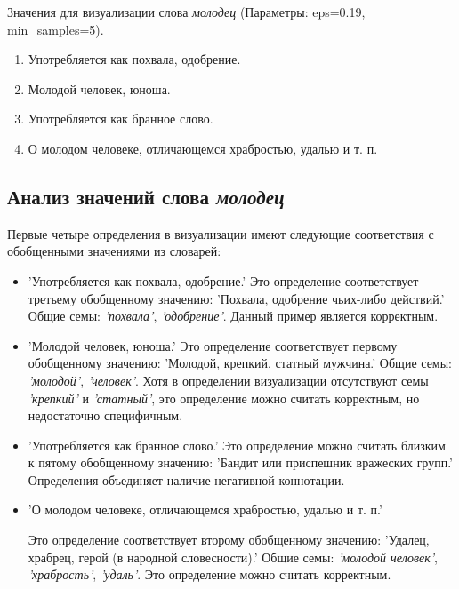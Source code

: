 Значения для визуализации слова \textit{молодец} (Параметры: eps=0.19, min\_samples=5).

\begin{enumerate}
    \item Употребляется как похвала, одобрение.
    \item Молодой человек, юноша.
    \item Употребляется как бранное слово.
    \item О молодом человеке, отличающемся храбростью, удалью и т. п.
\end{enumerate}

\subsection*{Анализ значений слова \textit{молодец}}

Первые четыре определения в визуализации имеют следующие соответствия с обобщенными значениями из словарей:

\begin{itemize}
    \item ’Употребляется как похвала, одобрение.’
Это определение соответствует третьему обобщенному значению:
’Похвала, одобрение чьих-либо действий.’ Общие семы: \textit{’похвала’}, \textit{’одобрение’}. Данный пример является корректным.

    \item ’Молодой человек, юноша.’
    Это определение соответствует первому обобщенному значению:
    ’Молодой, крепкий, статный мужчина.’
    Общие семы: \textit{’молодой’}, \textit{’человек’}.
    Хотя в определении визуализации отсутствуют семы \textit{’крепкий’} и \textit{’статный’}, это определение можно считать корректным, но недостаточно специфичным.

    \item ’Употребляется как бранное слово.’
    Это определение можно считать близким к пятому обобщенному значению:
    ’Бандит или приспешник вражеских групп.’
    Определения объединяет наличие негативной коннотации.

    \item ’О молодом человеке, отличающемся храбростью, удалью и т. п.’

    Это определение соответствует второму обобщенному значению:
    ’Удалец, храбрец, герой (в народной словесности).’
    Общие семы: \textit{’молодой человек’}, \textit{’храбрость’}, \textit{’удаль’}.
    Это определение можно считать корректным.

\end{itemize}

